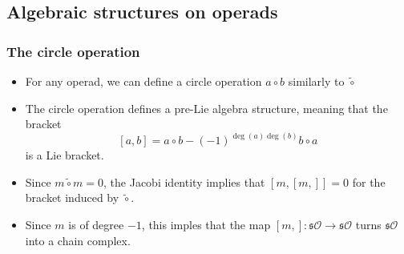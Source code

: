\documentclass{beamer}
\theoremstyle{definition}
\newtheorem{teorema}{Theorem}
\newtheorem{defi}{Definition}
\DeclareMathOperator{\im}{im}
\begin{document}
\subsection{Algebraic structures on operads}
\begin{frame}
\frametitle{The circle operation}
\begin{itemize}
\item<1-> For any operad, we can define a circle operation $a\circ b$ similarly to $\tilde{\circ}$ %
\item The circle operation defines a pre-Lie algebra structure, meaning that the bracket
\[[a,b]=a\circ b-(-1)^{\deg(a)\deg(b)}b\circ a\]
is a Lie bracket.
\end{itemize}
\end{frame}

\begin{frame}
\begin{itemize}
\item<1-> Since $m\tilde{\circ}m=0$, the Jacobi identity implies that $[m,[m,]]=0$ for the bracket induced by $\tilde{\circ}$.
\item<2-> Since $m$ is of degree $-1$, this imples that the map $[m,]:\mathfrak{s}\mathcal{O}\to\mathfrak{s}\mathcal{O}$ turns $\mathfrak{s}\mathcal{O}$ into a chain complex.
\end{itemize}
\end{frame}

%
%		
%		

%
%
\end{document}
